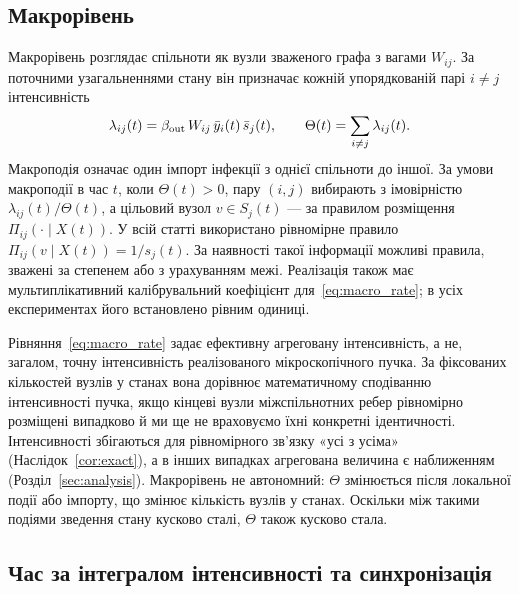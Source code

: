 \subsection{Макрорівень}
\label{sec:macro}

Макрорівень розглядає спільноти як вузли зваженого графа з вагами $W_{ij}$. За поточними узагальненнями стану він призначає кожній упорядкованій парі $i\neq j$ інтенсивність
\begin{equation}
\label{eq:macro_rate}
\lambda_{ij}(t)=\beta_{\mathrm{out}}\,W_{ij}\,\bar{y}_i(t)\,\bar{s}_j(t),
\qquad
\Theta(t)=\sum_{i\neq j}\lambda_{ij}(t).
\end{equation}
Макроподія означає один імпорт інфекції з однієї спільноти до іншої. За умови макроподії в час $t$, коли $\Theta(t)>0$, пару $(i,j)$ вибирають з імовірністю $\lambda_{ij}(t)/\Theta(t)$, а цільовий вузол $v\in S_j(t)$ --- за правилом розміщення $\Pi_{ij}(\cdot\mid X(t))$. У всій статті використано рівномірне правило $\Pi_{ij}(v\mid X(t))=1/s_j(t)$. За наявності такої інформації можливі правила, зважені за степенем або з урахуванням межі. Реалізація також має мультиплікативний калібрувальний коефіцієнт для~\eqref{eq:macro_rate}; в усіх експериментах його встановлено рівним одиниці.

Рівняння~\eqref{eq:macro_rate} задає ефективну агреговану інтенсивність, а не, загалом, точну інтенсивність реалізованого мікроскопічного пучка. За фіксованих кількостей вузлів у станах вона дорівнює математичному сподіванню інтенсивності пучка, якщо кінцеві вузли міжспільнотних ребер рівномірно розміщені випадково й ми ще не враховуємо їхні конкретні ідентичності. Інтенсивності збігаються для рівномірного зв'язку «усі з усіма» (Наслідок~\ref{cor:exact}), а в інших випадках агрегована величина є наближенням (Розділ~\ref{sec:analysis}). Макрорівень не автономний: $\Theta$ змінюється після локальної події або імпорту, що змінює кількість вузлів у станах. Оскільки між такими подіями зведення стану кусково сталі, $\Theta$ також кусково стала.

\subsection{Час за інтегралом інтенсивності та синхронізація}
\label{sec:timing}

